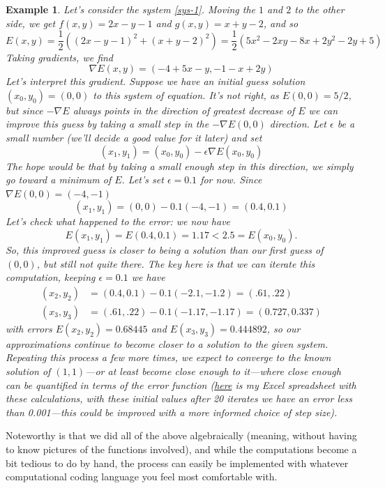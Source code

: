 \documentclass[12pt]{article}
\numberwithin{equation}{subsection}
\numberwithin{figure}{subsection}
\theoremstyle{note}
\newtheorem{example}[subsection]{Example}
\begin{document}
{\begin{example} \label{gd-ex}Let's consider the system \eqref{sys-1}. Moving the $1$ and $2$ to the other side, we get $f(x,y)=2x-y-1$ and $g(x,y)=x+y-2$, and so  \[ E(x,y)= \dfrac{1}{2} \left( (2x-y-1)^2 + (x+y-2)^2 \right)=\dfrac{1}{2} \left( 5 x^2 - 2x y - 8 x + 2y^2 - 2y + 5\right) \]
Taking gradients, we find \[ \nabla E(x,y) = \left( -4 + 5 x - y, -1 - x + 2 y\right)\]
Let's interpret this gradient. Suppose we have an initial guess solution $(x_0,y_0)=(0,0)$ to this system of equation. It's not right, as $E(0,0)=5/2$, but  since $-\nabla E$ always points in the direction of \textit{greatest decrease} of $E$ we can improve this guess by taking a small step in the $-\nabla E(0,0)$ direction. Let $\epsilon$ be a small number (we'll decide a good value for it later) and set \[ (x_1,y_1)=(x_0,y_0) - \epsilon \nabla E(x_0, y_0)\]  The hope would be that by taking a small enough step in this direction, we simply go toward a minimum of $E$. Let's set $\epsilon=0.1$ for now. Since $\nabla E(0,0)=(-4,-1)$ 
\[ (x_1,y_1)=(0,0)- 0.1 (-4,-1)=(0.4, 0.1)\]
Let's check what happened to the error: we now have \[E(x_1,y_1)=E(0.4, 0.1)=1.17<2.5=E(x_0,y_0).\] So, this improved guess is \textit{closer} to being a solution than our first guess of $(0,0)$, but still not quite there. The key here is that we can iterate this computation, keeping $\epsilon=0.1$ we have \begin{align*} (x_2,y_2) &= (0.4,0.1) - 0.1 (-2.1, -1.2)=(.61,.22) \\ 
(x_3,y_3) &= (.61,.22) -0.1 (-1.17, -1.17) = (0.727, 0.337)\end{align*}
with errors $E(x_2,y_2)= 0.68445$ and $E(x_3,y_3)=0.444892$, so our approximations continue to become closer to a solution to the given system. Repeating this process a few more times, we expect to converge to the known solution of $(1,1)$---or at least become \textit{close enough} to it---where close enough can be quantified in terms of the error function (\href{https://msoe.box.com/s/lkjin287s0ahd7dnecyb7t3pefqzrf0d}{here} is my Excel spreadsheet with these calculations, with these initial values after 20 iterates we have an error less than 0.001---this could be improved with a more informed choice of step size). 
\end{example}

Noteworthy is that we did all of the above algebraically (meaning, without having to know pictures of the functions involved), and while the computations become a bit tedious to do by hand, the process can easily be implemented with whatever computational coding language you feel most comfortable with.


}
\end{document}
